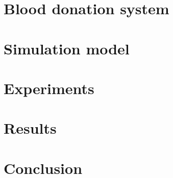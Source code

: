 \documentclass[a4paper,12pt]{article}
\begin{document}
\bigbreak


\section{Blood donation system}

\section{Simulation model}

\section{Experiments}

\section{Results}

\section{Conclusion}

\newpage



\end{document}
